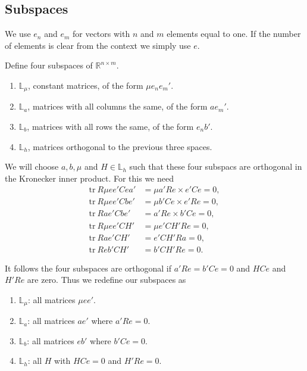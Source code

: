 \documentclass[
  12pt,
  letterpaper,
  DIV=11,
  numbers=noendperiod]{scrartcl}
\providecommand{\tightlist}{%
  \setlength{\itemsep}{0pt}\setlength{\parskip}{0pt}}
\begin{document}
\subsection{Subspaces}\label{subspaces}

We use \(e_n\) and \(e_m\) for vectors with \(n\) and \(m\) elements
equal to one. If the number of elements is clear from the context we
simply use \(e\).

Define four subspaces of \(\mathbb{R}^{n\times m}\).

\begin{enumerate}
\def\labelenumi{\arabic{enumi}.}
\tightlist
\item
  \(\mathbb{L}_\mu\), constant matrices, of the form \(\mu e_ne_m'\).
\item
  \(\mathbb{L}_a\), matrices with all columns the same, of the form
  \(ae_m'\).
\item
  \(\mathbb{L}_b\), matrices with all rows the same, of the form
  \(e_nb'\).
\item
  \(\mathbb{L}_h\), matrices orthogonal to the previous three spaces.
\end{enumerate}

We will choose \(a, b, \mu\) and \(H\in\mathbb{L}_h\) such that these
four subspacs are orthogonal in the Kronecker inner product. For this we
need \begin{subequations}
\begin{align}
\text{tr}\ R\mu ee'Cea'&=\mu a'Re\times e'Ce=0,\\
\text{tr}\ R\mu ee'Cbe'&=\mu b'Ce\times e'Re=0,\\
\text{tr}\ Rae'Cbe'&=a'Re\times b'Ce=0,\\
\text{tr}\ R\mu ee'CH'&=\mu e'CH'Re=0,\\
\text{tr}\ Rae'CH'&=e'CH'Ra=0,\\
\text{tr}\ Reb'CH'&=b'CH'Re=0.
\end{align}
\end{subequations}

It follows the four subspaces are orthogonal if \(a'Re=b'Ce=0\) and
\(HCe\) and \(H'Re\) are zero. Thus we redefine our subspaces as

\begin{enumerate}
\def\labelenumi{\arabic{enumi}.}
\tightlist
\item
  \(\mathbb{L}_\mu\): all matrices \(\mu ee'\).
\item
  \(\mathbb{L}_a\): all matrices \(ae'\) where \(a'Re=0\).
\item
  \(\mathbb{L}_b\): all matrices \(eb'\) where \(b'Ce=0\).
\item
  \(\mathbb{L}_h\): all \(H\) with \(HCe=0\) and \(H'Re=0\).
\end{enumerate}
\end{document}
